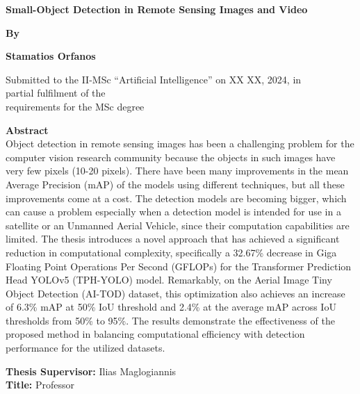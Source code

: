 




\begin{center}
    \textbf{\Large Small-Object Detection in Remote Sensing Images and Video}
\end{center}

\vspace{0.05in}

\begin{center}
    \textbf{\large By}
\end{center}

\vspace{0.05in}

\begin{center}
    \textbf{\large Stamatios Orfanos}
\end{center}

\vspace{0.05in}

\begin{center}
    Submitted to the II-MSc “Artificial Intelligence” on XX XX, 2024, in \\
    partial fulfilment of the \\
    requirements for the MSc degree
\end{center}





\vspace{1cm}

\textbf{\Large Abstract} \\
Object detection in remote sensing images has been a challenging problem for the computer vision research community because the objects in such images have very few pixels (10-20 pixels). There have been many improvements in the mean Average Precision (mAP) of the models using different techniques, but all these improvements come at a cost. The detection models are becoming bigger, which can cause a problem especially when a detection model is intended for use in a satellite or an Unmanned Aerial Vehicle, since their computation capabilities are limited. The thesis introduces a novel approach that has achieved a significant reduction in computational complexity, specifically a 32.67\% decrease in Giga Floating Point Operations Per Second (GFLOPs) for the Transformer Prediction Head YOLOv5 (TPH-YOLO) model. Remarkably, on the Aerial Image Tiny Object Detection (AI-TOD) dataset, this optimization also achieves an increase of 6.3\% mAP at 50\% IoU threshold and 2.4\% at the average mAP across IoU thresholds from 50\% to 95\%. The results demonstrate the effectiveness of the proposed method in balancing computational efficiency with detection performance for the utilized datasets.




\vspace{0.05in}

\textbf{Thesis Supervisor:} Ilias Maglogiannis \\
\textbf{Title:} Professor

